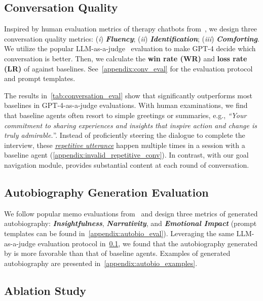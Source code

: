 \subsection{Conversation Quality}\label{section:conversation_eval}

Inspired by human evaluation metrics of therapy chatbots from~\citet{Wang2023EnhancingTC}, we design three conversation quality metrics: (\textit{i}) \textbf{\textit{Fluency}}; (\textit{ii}) \textbf{\textit{Identification}}; (\textit{iii}) \textbf{\textit{Comforting}}. We utilize the popular LLM-as-a-judge~\cite{zheng2024judging} evaluation to make GPT-4 decide which conversation is better. Then, we calculate the \textbf{win rate (WR)} and \textbf{loss rate (LR)} of \methodname against baselines. See~\ref{appendix:conv_eval} for the evaluation protocol and prompt templates.

The results in~\cref{tab:conversation_eval} show that \methodname significantly outperforms most baselines in GPT-4-as-a-judge evaluations. With human examinations, we find that baseline agents often resort to simple greetings or summaries, e.g., \textit{``Your commitment to sharing experiences and insights that inspire action and change is truly admirable.}''. Instead of proficiently steering the dialogue to complete the interview, these \underline{\textit{repetitive utterance}} happen multiple times in a session with a baseline agent (\cref{appendix:invalid_repetitive_conv}). In contrast, with our goal navigation module, \methodname provides substantial content at each round of conversation.


\subsection{Autobiography Generation Evaluation}\label{section:autobio_eval}
We follow popular memo evaluations from~\citet{quoraRateCritique, 10.1093/actrade/9780199669240.001.0001, jbp:/content/journals/10.1075/ni.21.2.08smo, 10.1159/000100939} and design three metrics of generated autobiography: \textbf{\textit{Insightfulness}}, \textbf{\textit{Narrativity}}, and \textbf{\textit{Emotional Impact}} (prompt templates can be found in~\cref{appendix:autobio_eval}). Leveraging the same LLM-as-a-judge evaluation protocol in~\cref{section:conversation_eval}, we found that the autobiography generated by \methodname is more favorable than that of baseline agents. 
Examples of generated autobiography are presented in~\cref{appendix:autobio_examples}. 

\subsection{Ablation Study}


